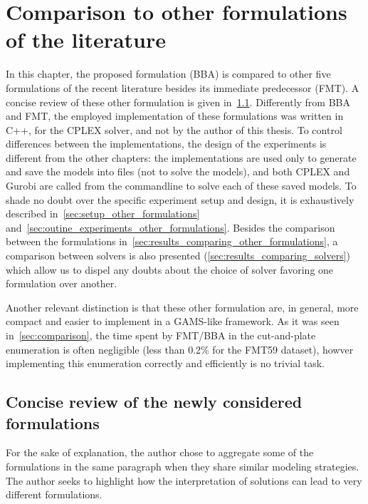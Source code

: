 \chapter{Comparison to other formulations of the literature}
\label{sec:martin_chapter}

In this chapter, the proposed formulation (BBA) is compared to other five formulations of the recent literature besides its immediate predecessor (FMT).
A concise review of these other formulation is given in~\cref{sec:other_formulations}.
Differently from BBA and FMT, the employed implementation of these formulations was written in C++, for the CPLEX solver, and not by the author of this thesis.
To control differences between the implementations, the design of the experiments is different from the other chapters: the implementations are used only to generate and save the models into files (not to solve the models), and both CPLEX and Gurobi are called from the commandline to solve each of these saved models.
To shade no doubt over the specific experiment setup and design, it is exhaustively described in~\cref{sec:setup_other_formulations} and~\cref{sec:outine_experiments_other_formulations}.
Besides the comparison between the formulations in~\cref{sec:results_comparing_other_formulations}, a comparison between solvers is also presented (\cref{sec:results_comparing_solvers}) which allow us to dispel any doubts about the choice of solver favoring one formulation over another.

Another relevant distinction is that these other formulation are, in general, more compact and easier to implement in a GAMS-like framework.
As it was seen in~\cref{sec:comparison}, the time spent by FMT/BBA in the cut-and-plate enumeration is often negligible (less than 0.2\% for the FMT59 dataset), howver implementing this enumeration correctly and efficiently is no trivial task.

\section{Concise review of the newly considered formulations}
\label{sec:other_formulations}

For the sake of explanation, the author chose to aggregate some of the formulations in the same paragraph when they share similar modeling strategies.
The author seeks to highlight how the interpretation of solutions can lead to very different formulations.

